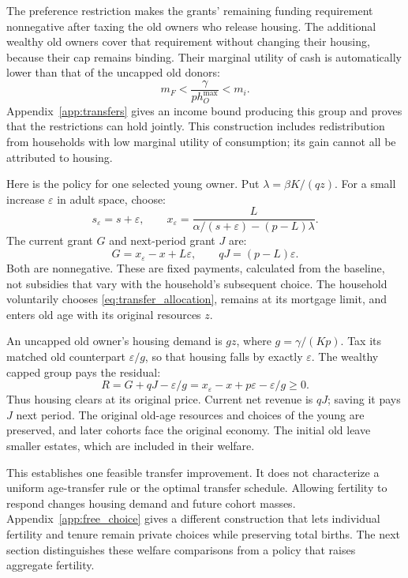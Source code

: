 \documentclass[11pt]{article}
\begin{document}
The preference restriction makes the grants' remaining funding requirement
nonnegative after taxing the old owners who release housing. The additional
wealthy old owners cover that requirement without changing their housing,
because their cap remains binding. Their marginal utility of cash is
automatically lower than that of the uncapped old donors:
\begin{equation}
m_F<\frac\gamma{p h_O^{\max}}<m_i.
\label{eq:cap_marginal_order}
\end{equation}
Appendix~\ref{app:transfers} gives an income bound producing this group and proves that the restrictions can hold
jointly. This construction includes redistribution from households with low
marginal utility of consumption; its gain cannot all be attributed to housing.

Here is the policy for one selected young owner. Put $\lambda=\beta K/(qz)$.
For a small increase $\varepsilon$ in adult space, choose:
\begin{equation}
s_\varepsilon=s+\varepsilon,\qquad
x_\varepsilon=\frac L{\alpha/(s+\varepsilon)-(p-L)\lambda}.
\label{eq:transfer_allocation}
\end{equation}
The current grant $G$ and next-period grant $J$ are:
\begin{equation}
G=x_\varepsilon-x+L\varepsilon,
\qquad qJ=(p-L)\varepsilon.
\label{eq:transfer_grants}
\end{equation}
Both are nonnegative. These are fixed payments, calculated from the baseline,
not subsidies that vary with the household's subsequent choice. The household
voluntarily chooses \eqref{eq:transfer_allocation}, remains at its mortgage
limit, and enters old age with its original resources $z$.

An uncapped old owner's housing demand is $gz$, where $g=\gamma/(Kp)$.
Tax its matched old counterpart $\varepsilon/g$, so that housing falls by
exactly $\varepsilon$. The wealthy capped group pays the residual:
\begin{equation}
R=G+qJ-\varepsilon/g=x_\varepsilon-x+p\varepsilon-\varepsilon/g\ge0.
\label{eq:residual}
\end{equation}
Thus housing clears at its original price. Current net revenue is $qJ$;
saving it pays $J$ next period. The original old-age resources and choices
of the young are preserved, and later cohorts face the original economy.
The initial old leave smaller estates, which are included in their welfare.

This establishes one feasible transfer improvement. It does not characterize
a uniform age-transfer rule or the optimal transfer schedule. Allowing
fertility to respond changes housing demand and future cohort masses.
Appendix~\ref{app:free_choice} gives a different construction that lets
individual fertility and tenure remain private choices while preserving total
births. The next section distinguishes these welfare comparisons from a
policy that raises aggregate fertility.
\end{document}
